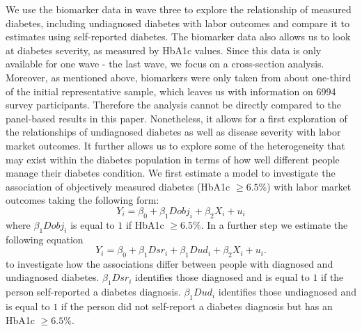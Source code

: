 \documentclass[12pt,english,british]{article}
\begin{document}
We use the biomarker data in wave three to explore the relationship of measured diabetes, including undiagnosed diabetes with labor outcomes and compare it to estimates using self-reported diabetes. The biomarker data also allows us to look at diabetes severity, as measured
by \ac{HbA1c} values. Since this data is only available for one wave - the
last wave, we focus on a cross-section analysis. Moreover,
as mentioned above, biomarkers were only taken from about one-third  of the initial representative sample, which leaves
us with information on 6994 survey participants. Therefore the analysis
cannot be directly compared to the panel-based results in this paper.
Nonetheless, it allows for a first exploration of the relationships
of undiagnosed diabetes as well as disease severity with labor market
outcomes.  It further allows us to explore
some of the heterogeneity that may exist within the diabetes population
in terms of how well different people manage their diabetes condition.
We first estimate a model to investigate the association of objectively
measured diabetes (HbA1c $\geq6.5\%$) with labor market outcomes
taking the following form: 
\begin{equation}
Y_{i}=\beta_{0}+\beta_{1}Dobj_{i}+\beta_{2}X_{i}+u_{i}\label{eq:diab_objective}
\end{equation}
where $\beta_{1}Dobj_{i}$ is equal to $1$ if HbA1c $\geq6.5\%$.
In a further step we estimate the following equation 
\begin{equation}
Y_{i}=\beta_{0}+\beta_{1}Dsr_{i}+\beta_{1}Dud_{i}+\beta_{2}X_{i}+u_{i}.\label{eq:diab_sr_ud}
\end{equation}
to investigate how the associations differ between people with diagnosed
and undiagnosed diabetes. $\beta_{1}Dsr_{i}$ identifies those diagnosed
and is equal to $1$ if the person self-reported a diabetes diagnosis.
$\beta_{1}Dud_{i}$ identifies those undiagnosed and is equal to $1$
if the person did not self-report a diabetes diagnosis but has an
HbA1c $\geq6.5\%$.
\end{document}
